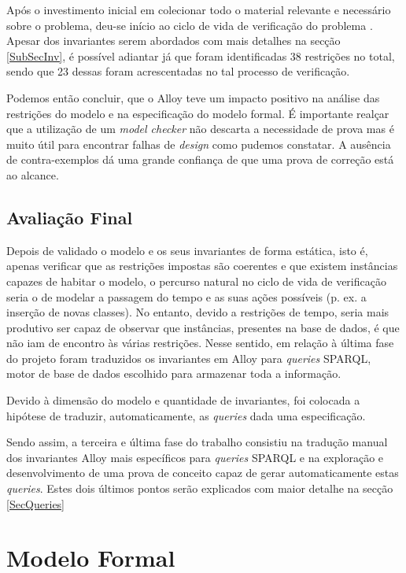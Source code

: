\documentclass[tikz,runningheads,a4paper]{llncs}
\begin{document}
Após o investimento inicial em colecionar todo o material relevante e necessário sobre o problema, deu-se início ao ciclo de vida de verificação do problema \cite{jno}. Apesar dos invariantes serem abordados com mais detalhes na secção \ref{SubSecInv}, é possível adiantar já que foram identificadas 38 restrições no total, sendo que 23 dessas foram acrescentadas no tal processo de verificação.

Podemos então concluir, que o Alloy teve um impacto positivo na análise das restrições do modelo e na especificação do modelo formal. É importante realçar que a utilização de um \textit{model checker} não descarta a necessidade de prova mas é muito útil para encontrar falhas de \textit{design} como pudemos constatar. A ausência de contra-exemplos dá uma grande confiança de que uma prova de correção está ao alcance.

\subsection{Avaliação Final}

Depois de validado o modelo e os seus invariantes de forma estática, isto é,
apenas verificar que as restrições impostas são coerentes e que existem
instâncias capazes de habitar o modelo, o percurso natural no ciclo de vida de
verificação seria o de modelar a passagem do tempo e as suas ações possíveis
(p. ex. a inserção de novas classes). No entanto, devido a restrições de tempo,
seria mais produtivo ser capaz de observar que instâncias, presentes na base de
dados, é que não iam de encontro às várias restrições. Nesse sentido, em relação
à última fase do projeto foram traduzidos os invariantes em Alloy para
\textit{queries} SPARQL, motor de base de dados escolhido para armazenar toda a
informação.

Devido à dimensão do modelo e quantidade de invariantes, foi colocada a hipótese
de traduzir, automaticamente, as \textit{queries} dada uma especificação.

Sendo assim, a terceira e última fase do trabalho consistiu na tradução manual
dos invariantes Alloy mais específicos para \textit{queries} SPARQL e na
exploração e desenvolvimento de uma prova de conceito capaz de gerar
automaticamente estas \textit{queries}. Estes dois últimos pontos serão explicados com
maior detalhe na secção \ref{SecQueries}

\section{Modelo Formal} \label{SecModel}
\end{document}
